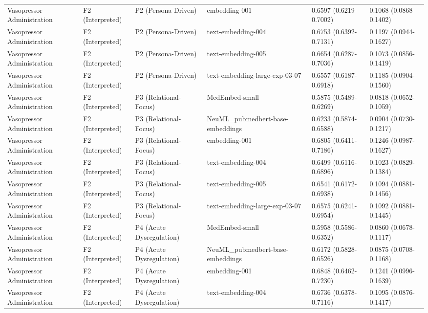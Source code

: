 \documentclass[border=0pt]{standalone}
\begin{document}
\begin{adjustbox}{width=\textwidth}
\begin{tabular}{llllll}
Vasopressor Administration & F2 (Interpreted) & P2 (Persona-Driven) & embedding-001 & 0.6597 (0.6219-0.7002) & 0.1068 (0.0868-0.1402) \\
Vasopressor Administration & F2 (Interpreted) & P2 (Persona-Driven) & text-embedding-004 & 0.6753 (0.6392-0.7131) & 0.1197 (0.0944-0.1627) \\
Vasopressor Administration & F2 (Interpreted) & P2 (Persona-Driven) & text-embedding-005 & 0.6654 (0.6287-0.7036) & 0.1073 (0.0856-0.1419) \\
Vasopressor Administration & F2 (Interpreted) & P2 (Persona-Driven) & text-embedding-large-exp-03-07 & 0.6557 (0.6187-0.6918) & 0.1185 (0.0904-0.1560) \\
Vasopressor Administration & F2 (Interpreted) & P3 (Relational-Focus) & MedEmbed-small & 0.5875 (0.5489-0.6269) & 0.0818 (0.0652-0.1059) \\
Vasopressor Administration & F2 (Interpreted) & P3 (Relational-Focus) & NeuML\_pubmedbert-base-embeddings & 0.6233 (0.5874-0.6588) & 0.0904 (0.0730-0.1217) \\
Vasopressor Administration & F2 (Interpreted) & P3 (Relational-Focus) & embedding-001 & 0.6805 (0.6411-0.7186) & 0.1246 (0.0987-0.1627) \\
Vasopressor Administration & F2 (Interpreted) & P3 (Relational-Focus) & text-embedding-004 & 0.6499 (0.6116-0.6896) & 0.1023 (0.0829-0.1384) \\
Vasopressor Administration & F2 (Interpreted) & P3 (Relational-Focus) & text-embedding-005 & 0.6541 (0.6172-0.6938) & 0.1094 (0.0881-0.1456) \\
Vasopressor Administration & F2 (Interpreted) & P3 (Relational-Focus) & text-embedding-large-exp-03-07 & 0.6575 (0.6241-0.6954) & 0.1092 (0.0881-0.1445) \\
Vasopressor Administration & F2 (Interpreted) & P4 (Acute Dysregulation) & MedEmbed-small & 0.5958 (0.5586-0.6352) & 0.0860 (0.0678-0.1117) \\
Vasopressor Administration & F2 (Interpreted) & P4 (Acute Dysregulation) & NeuML\_pubmedbert-base-embeddings & 0.6172 (0.5828-0.6526) & 0.0875 (0.0708-0.1168) \\
Vasopressor Administration & F2 (Interpreted) & P4 (Acute Dysregulation) & embedding-001 & 0.6848 (0.6462-0.7230) & 0.1241 (0.0996-0.1639) \\
Vasopressor Administration & F2 (Interpreted) & P4 (Acute Dysregulation) & text-embedding-004 & 0.6736 (0.6378-0.7116) & 0.1095 (0.0876-0.1417) \\

\end{tabular}
\end{adjustbox}
\end{document}
